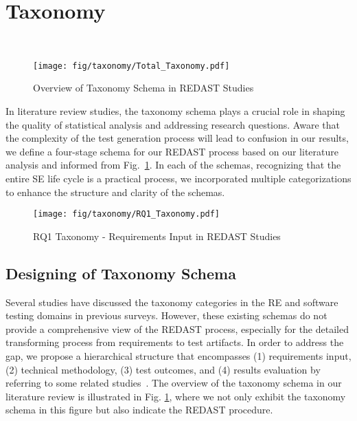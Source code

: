 \section{Taxonomy}~\label{sec:Taxonomy}

\begin{figure}[!t]
    \centering
    \texttt{[image: fig/taxonomy/Total\_Taxonomy.pdf]}
    \caption{Overview of Taxonomy Schema in REDAST Studies}
    \label{fig:taxonomy}
\end{figure}

In literature review studies, the taxonomy schema plays a crucial role in shaping the quality of statistical analysis and addressing research questions. Aware that the complexity of the test generation process will lead to confusion in our results, we define a four-stage schema for our REDAST process based on our literature analysis and informed from Fig.~\ref{fig:taxonomy}. In each of the schemas, recognizing that the entire SE life cycle is a practical process, we incorporated multiple categorizations to enhance the structure and clarity of the schemas.

\begin{figure}[!t]
    \centering
    \texttt{[image: fig/taxonomy/RQ1\_Taxonomy.pdf]}
    \caption{RQ1 Taxonomy - Requirements Input in REDAST Studies}
    \label{fig:RQ1_taxonomy}
\end{figure}

\subsection{Designing of Taxonomy Schema}

Several studies have discussed the taxonomy categories in the RE and software testing domains in previous surveys. However, these existing schemas do not provide a comprehensive view of the REDAST process, especially for the detailed transforming process from requirements to test artifacts. In order to address the gap, we propose a hierarchical structure that encompasses (1) requirements input, (2) technical methodology, (3) test outcomes, and (4) results evaluation by referring to some related studies~\cite{redast_survey,align_req_test_01}. The overview of the taxonomy schema in our literature review is illustrated in Fig. \ref{fig:taxonomy}, where we not only exhibit the taxonomy schema in this figure but also indicate the REDAST procedure.



